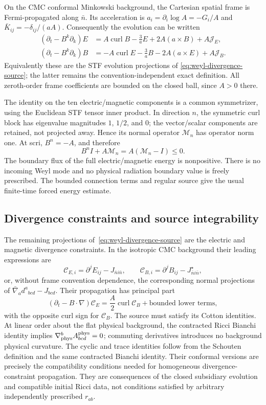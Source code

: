 On the CMC conformal Minkowski background, the Cartesian spatial frame is
Fermi-propagated along $\bar n$.  Its acceleration is
$a_i=\partial_i\log A=-G_i/A$ and
$\bar K_{ij}=-\delta_{ij}/(aA)$.  Consequently the evolution can be written
\begin{align}
 (\partial_t-B^k\partial_k)E
 &=A\operatorname{curl}B-\frac3aE
 +2A(a\mathbin\times B)+A\mathcal J_E,\\
 (\partial_t-B^k\partial_k)B
 &=-A\operatorname{curl}E-\frac3aB
 -2A(a\mathbin\times E)+A\mathcal J_B.
\end{align}
Equivalently these are the STF evolution projections of
\eqref{eq:weyl-divergence-source}; the latter remains the convention-independent
exact definition.  All zeroth-order frame coefficients are bounded on the
closed ball, since $A>0$ there.

The identity on the ten electric/magnetic components is a common
symmetrizer, using the Euclidean STF tensor inner product.  In direction $n$,
the symmetric curl block has eigenvalue magnitudes $1$, $1/2$, and $0$;
the vector/scalar components are retained, not projected away.  Hence its
normal operator $\mathcal M_n$ has operator norm one.  At scri,
$B^n=-A$, and therefore
\[
 B^n I+A\mathcal M_n=A(\mathcal M_n-I)\leq0.
\]
The boundary flux of the full electric/magnetic energy is nonpositive.
There is no incoming Weyl mode and no physical radiation boundary value is
freely prescribed.  The bounded connection terms and regular source give
the usual finite-time forced energy estimate.

\subsection{Divergence constraints and source integrability}

The remaining projections of~\eqref{eq:weyl-divergence-source} are the
electric and magnetic divergence constraints.  In the isotropic CMC
background their leading expressions are
\[
 \mathcal C_{E,i}=\partial^jE_{ij}-J_{\bar n i\bar n},\qquad
 \mathcal C_{B,i}=\partial^jB_{ij}-J^\star_{\bar n i\bar n},
\]
or, without frame convention dependence, the corresponding normal
projections of $\bar\nabla_a d^a{}_{bcd}-J_{bcd}$.
Their propagation has principal part
\[
 (\partial_t-B\cdot\nabla)\mathcal C_E
 =\frac A2\operatorname{curl}\mathcal C_B+\text{bounded lower terms},
\]
with the opposite curl sign for $\mathcal C_B$.
The source must satisfy its Cotton identities.  At linear order about the
flat physical background, the contracted Ricci Bianchi identity implies
$\nabla_{\rm phys}^bA^{\rm phys}_{bcd}=0$; commuting derivatives introduces
no background physical curvature.  The cyclic and trace identities follow
from the Schouten definition and the same contracted Bianchi identity.
Their conformal versions are precisely the compatibility conditions needed
for homogeneous divergence-constraint propagation.  They are consequences
of the closed subsidiary evolution and compatible initial Ricci data, not
conditions satisfied by arbitrary independently prescribed $r_{ab}$.

